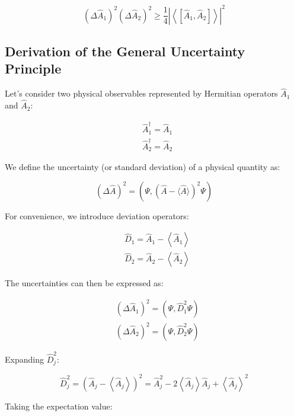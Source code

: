 \documentclass[italian]{HKNdocument}
\begin{document}
\begin{equation}
\left(\Delta \hat{A}_{1}\right)^{2}\left(\Delta \hat{A}_{2}\right)^{2} \geq \frac{1}{4}\left|\left\langle\left[\hat{A}_{1}, \hat{A}_{2}\right]\right\rangle\right|^{2}
\end{equation}


\subsection{Derivation of the General Uncertainty Principle}

Let's consider two physical observables represented by Hermitian operators $\hat{A}_1$ and $\hat{A}_2$:

\begin{align}
& \hat{A}_{1}^{\dagger}=\hat{A}_{1} \\
& \hat{A}_{2}^{\dagger}=\hat{A}_{2}
\end{align}

We define the uncertainty (or standard deviation) of a physical quantity as:

\begin{equation}
(\Delta \hat{A})^{2}=\left(\Psi,(\hat{A}-\langle\hat{A}\rangle)^{2} \Psi\right)
\end{equation}

For convenience, we introduce deviation operators:

\begin{align}
& \hat{D}_{1}=\hat{A}_{1}-\left\langle\hat{A}_{1}\right\rangle \\
& \hat{D}_{2}=\hat{A}_{2}-\left\langle\hat{A}_{2}\right\rangle
\end{align}

The uncertainties can then be expressed as:

\begin{align}
& \left(\Delta \hat{A}_{1}\right)^{2}=\left(\Psi, \hat{D}_{1}^{2} \Psi\right) \\
& \left(\Delta \hat{A}_{2}\right)^{2}=\left(\Psi, \hat{D}_{2}^{2} \Psi\right)
\end{align}

Expanding $\hat{D}_j^2$:

\begin{equation}
\hat{D}_{j}^{2}=\left(\hat{A}_{j}-\left\langle\hat{A}_{j}\right\rangle\right)^{2}=\hat{A}_{j}^{2}-2\left\langle\hat{A}_{j}\right\rangle \hat{A}_{j}+\left\langle\hat{A}_{j}\right\rangle^{2}
\end{equation}

Taking the expectation value:
\end{document}

